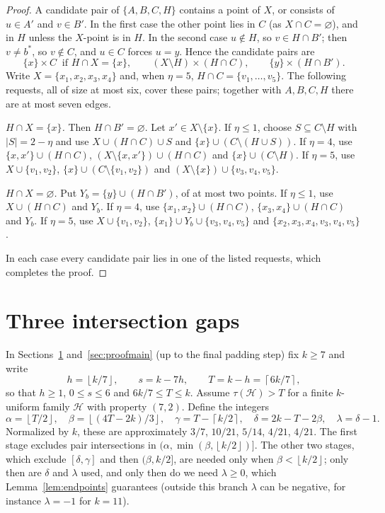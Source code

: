 \documentclass[11pt]{article}
\numberwithin{equation}{section}
\theoremstyle{definition}
\theoremstyle{remark}
\newcommand{\HH}{\mathcal H}
\newcommand{\ceil}[1]{\left\lceil #1\right\rceil}
\newcommand{\floor}[1]{\left\lfloor #1\right\rfloor}
\begin{document}
\begin{proof}
A candidate pair of $\{A,B,C,H\}$ contains a point of $X$, or consists of
$u\in A'$ and $v\in B'$. In the first case the other point lies in $C$
(as $X\cap C=\varnothing$), and in $H$ unless the $X$-point is in $H$. In
the second case $u\notin H$, so $v\in H\cap B'$; then $v\ne b^*$, so
$v\notin C$, and $u\in C$ forces $u=y$. Hence the candidate pairs are
\[
 \{x\}\times C\ \text{ if } H\cap X=\{x\},\qquad
 (X\setminus H)\times(H\cap C),\qquad \{y\}\times(H\cap B').
\]
Write $X=\{x_1,x_2,x_3,x_4\}$ and, when $\eta=5$,
$H\cap C=\{v_1,\dots,v_5\}$. The following requests, all of size at most
six, cover these pairs; together with $A,B,C,H$ there are at most seven
edges.

\emph{$H\cap X=\{x\}$.} Then $H\cap B'=\varnothing$. Let $x'\in X\setminus\{x\}$.
If $\eta\le1$, choose $S\subseteq C\setminus H$ with $|S|=2-\eta$ and use
$X\cup(H\cap C)\cup S$ and $\{x\}\cup(C\setminus(H\cup S))$. If $\eta=4$, use
$\{x,x'\}\cup(H\cap C)$, $(X\setminus\{x,x'\})\cup(H\cap C)$ and
$\{x\}\cup(C\setminus H)$. If $\eta=5$, use $X\cup\{v_1,v_2\}$,
$\{x\}\cup(C\setminus\{v_1,v_2\})$ and $(X\setminus\{x\})\cup\{v_3,v_4,v_5\}$.

\emph{$H\cap X=\varnothing$.} Put $Y_b=\{y\}\cup(H\cap B')$, of at most two
points. If $\eta\le1$, use $X\cup(H\cap C)$ and $Y_b$. If $\eta=4$, use
$\{x_1,x_2\}\cup(H\cap C)$, $\{x_3,x_4\}\cup(H\cap C)$ and $Y_b$. If
$\eta=5$, use $X\cup\{v_1,v_2\}$, $\{x_1\}\cup Y_b\cup\{v_3,v_4,v_5\}$ and
$\{x_2,x_3,x_4,v_3,v_4,v_5\}$.

In each case every candidate pair lies in one of the listed requests,
which completes the proof.
\end{proof}

\section{Three intersection gaps}\label{sec:gaps}

In Sections~\ref{sec:gaps} and~\ref{sec:proofmain} (up to the final
padding step) fix $k\ge7$ and write
\[
 h=\floor{k/7},\qquad s=k-7h,\qquad T=k-h=\ceil{6k/7},
\]
so that $h\ge1$, $0\le s\le6$ and $6k/7\le T\le k$. Assume
$\tau(\HH)>T$ for a finite $k$-uniform family $\HH$ with property
$(7,2)$. Define the integers
\begin{equation}\label{eq:endpoints}
 \alpha=\floor{T/2},\quad \beta=\floor{(4T-2k)/3},\quad
 \gamma=T-\ceil{k/2},\quad \delta=2k-T-2\beta,\quad \lambda=\delta-1.
\end{equation}
Normalized by $k$, these are approximately $3/7$, $10/21$, $5/14$,
$4/21$, $4/21$. The first stage excludes pair intersections in
$(\alpha,\min(\beta,\floor{k/2})]$. The other two stages, which exclude
$[\delta,\gamma]$ and then $(\beta,k/2]$, are needed only when
$\beta<\floor{k/2}$; only then are $\delta$ and $\lambda$ used, and only
then do we need $\lambda\ge0$, which Lemma~\ref{lem:endpoints} guarantees
(outside this branch $\lambda$ can be negative, for instance $\lambda=-1$
for $k=11$).
\end{document}
